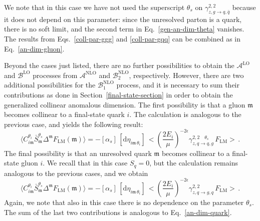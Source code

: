 \documentclass[a4paper, 12pt]{book}
\newcommand{\um}{\mathfrak{m}}
\begin{document}
We note that in this case we have not used the superscript $\theta_s$ on $\gamma^{2,2}_{z,g \to q, \bar{q}}$ because it does not depend on this parameter: since the unresolved parton is a quark, there is no soft limit, and the second term in Eq.~\ref{gen-an-dim-theta} vanishes. The results from Eqs.~\ref{coll-par-ggg} and \ref{coll-par-gqq} can be combined as in Eq.~\ref{an-dim-gluon}.

Beyond the cases just listed, there are no further possibilities to obtain the $\mathcal{A}^{\mathrm{LO}}$ and $\mathcal{B}^{\mathrm{LO}}$ processes from $\mathcal{A}^{\mathrm{NLO}}$ and $\mathcal{B}_2^{\mathrm{NLO}}$, respectively. However, there are two additional possibilities for the $\mathcal{B}_1^{\mathrm{NLO}}$ process, and it is necessary to sum their contributions as done in Section~\ref{final-state-section} in order to obtain the generalized collinear anomalous dimension. The first possibility is that a gluon $\um$ becomes collinear to a final-state quark $i$. The calculation is analogous to the previous case, and yields the following result:
\begin{equation}
  \langle C_{i\mathfrak{m}}^{\theta_i} \bar{S}_{\mathfrak{m}}^{\theta_s} \Delta^{\mathfrak{m}} F_{\mathrm{LM}}(\mathfrak{m})\rangle = -[\alpha_s] \,[\mathrm{d}\eta_{i\um \, \theta_i}] \, \bigl< \left(\frac{2E_i}{\mu}\right)^{-2\epsilon} \gamma^{2,2 \quad \theta_s}_{z,q \to q, g} \, F_{\mathrm{LM}} \bigr> \, . 
\end{equation}
The final possibility is that an unresolved quark $\um$ becomes collinear to a final-state gluon $i$. We recall that in this case $S_q=0$, but the calculation remains analogous to the previous cases, and we obtain
\begin{equation}
  \langle C_{i\mathfrak{m}}^{\theta_i} \bar{S}_{\mathfrak{m}}^{\theta_s} \Delta^{\mathfrak{m}} F_{\mathrm{LM}}(\mathfrak{m})\rangle = -[\alpha_s] \,[\mathrm{d}\eta_{i\um \, \theta_i}] \, \bigl< \left(\frac{2E_i}{\mu}\right)^{-2\epsilon} \gamma^{2,2}_{z,q \to g, q} \, F_{\mathrm{LM}} \bigr> \, . 
\end{equation}
Again, we note that also in this case there is no dependence on the parameter $\theta_s$. The sum of the last two contributions is analogous to Eq.~\ref{an-dim-quark}. \\
\end{document}

